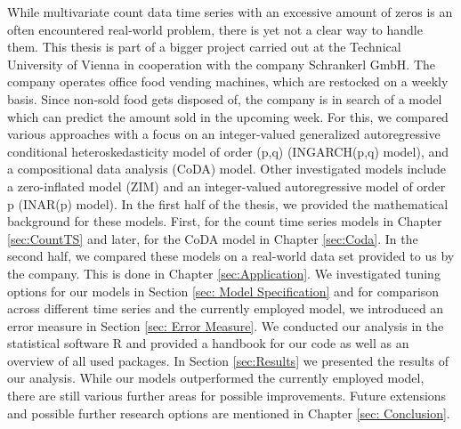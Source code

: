 While multivariate count data time series with an excessive amount of zeros is an often encountered real-world problem, there is yet not a clear way to handle them. This thesis is part of a bigger project carried out at the Technical University of Vienna in cooperation with the company Schrankerl GmbH. The company operates office food vending machines, which are restocked on a weekly basis. Since non-sold food gets disposed of, the company is in search of a model which can predict the amount sold in the upcoming week. For this, we compared various approaches with a focus on an integer-valued generalized autoregressive conditional heteroskedasticity model of order (p,q) (INGARCH(p,q) model), and a compositional data analysis (CoDA) model. Other investigated models include a zero-inflated model (ZIM) and an integer-valued autoregressive model of order p (INAR(p) model). In the first half of the thesis, we provided the mathematical background for these models. First, for the count time series models in Chapter \ref{sec:CountTS} and later, for the CoDA model in Chapter \ref{sec:Coda}. In the second half, we compared these models on a real-world data set provided to us by the company. This is done in Chapter \ref{sec:Application}. We investigated tuning options for our models in Section \ref{sec: Model Specification} and for comparison across different time series and the currently employed model, we introduced an error measure in Section \ref{sec: Error Measure}. We conducted our analysis in the statistical software R and provided a handbook for our code as well as an overview of all used packages. In Section \ref{sec:Results} we presented the results of our analysis.  While our models outperformed the currently employed model, there are still various further areas for possible improvements. Future extensions and possible further research options are mentioned in Chapter \ref{sec: Conclusion}. 